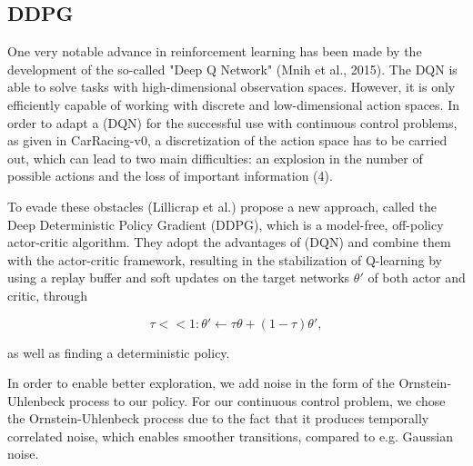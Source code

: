 \documentclass[letterpaper, 10 pt, conference]{ieeeconf}  %
\begin{document}
\subsection{DDPG}
One very notable advance in reinforcement learning has been made by the development of the so-called "Deep Q Network" (Mnih et al., 2015). The DQN is able to solve tasks with high-dimensional observation spaces. However, it is only efficiently capable of working with discrete and low-dimensional action spaces. In order to adapt a (DQN) for the successful use with continuous control problems, as given in CarRacing-v0, a discretization of the action space has to be carried out, which can lead to two main difficulties: an explosion in the number of possible actions and the loss of important information (4).

To evade these obstacles (Lillicrap et al.) propose a new approach, called the Deep Deterministic Policy Gradient (DDPG), which is a model-free, off-policy actor-critic algorithm. They adopt the advantages of (DQN) and combine them with the actor-critic framework, resulting in the stabilization of Q-learning by using a replay buffer and soft updates on the target networks $\theta'$ of both actor and critic, through

\begin{equation}
\tau << 1:\theta' \leftarrow \tau\theta + (1-\tau)\theta',
\end{equation}

as well as finding a deterministic policy.

In order to enable better exploration, we add noise in the form of the Ornstein-Uhlenbeck process to our policy. For our continuous control problem, we chose the Ornstein-Uhlenbeck process due to the fact that it produces temporally correlated noise, which enables smoother transitions, compared to e.g. Gaussian noise. 
\end{document}
